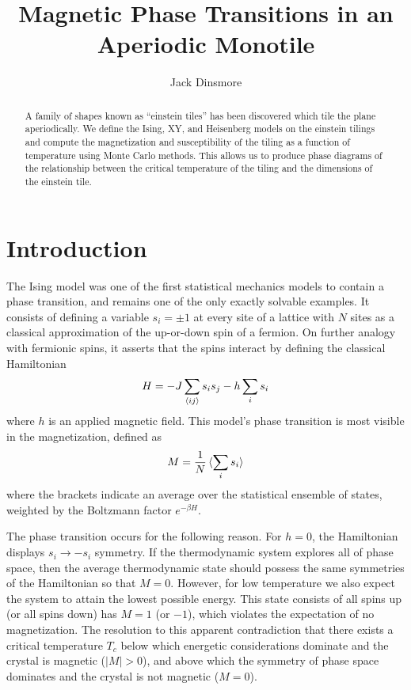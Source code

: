\documentclass[amsmath,amssymb,aps,twocolumn,nofootinbib]{revtex4-2}
\begin{document}
\title{Magnetic Phase Transitions in an Aperiodic Monotile}
\author{Jack Dinsmore}

\begin{abstract}
  A family of shapes known as ``einstein tiles'' has been discovered which tile the plane aperiodically. We define the Ising, XY, and Heisenberg models on the einstein tilings and compute the magnetization and susceptibility of the tiling as a function of temperature using Monte Carlo methods. This allows us to produce phase diagrams of the relationship between the critical temperature of the tiling and the dimensions of the einstein tile.
\end{abstract}

\maketitle

\section{Introduction}
The Ising model was one of the first statistical mechanics models to contain a phase transition, and remains one of the only exactly solvable examples. It consists of defining a variable $s_i = \pm 1$ at every site of a lattice with $N$ sites as a classical approximation of the up-or-down spin of a fermion. On further analogy with fermionic spins, it asserts that the spins interact by defining the classical Hamiltonian
\begin{equation}
  H = -J \sum_{\braket{ij}} s_i s_j - h \sum_i s_i
  \label{eqn:ising}
\end{equation}
where $h$ is an applied magnetic field. This model's phase transition is most visible in the magnetization, defined as
\begin{equation}
  M = \frac{1}{N}\braket{\sum_{i} s_i}
  \label{eqn:magnetization}
\end{equation}
where the brackets indicate an average over the statistical ensemble of states, weighted by the Boltzmann factor $e^{-\beta H}$.

The phase transition occurs for the following reason. For $h=0$, the Hamiltonian displays $s_i\rightarrow -s_i$ symmetry. If the thermodynamic system explores all of phase space, then the average thermodynamic state should possess the same symmetries of the Hamiltonian so that $M=0$. However, for low temperature we also expect the system to attain the lowest possible energy. This state consists of all spins up (or all spins down) has $M = 1$ (or $-1$), which violates the expectation of no magnetization. The resolution to this apparent contradiction that there exists a critical temperature $T_c$ below which energetic considerations dominate and the crystal is magnetic ($|M|>0$), and above which the symmetry of phase space dominates and the crystal is not magnetic ($M = 0$).
\end{document}
